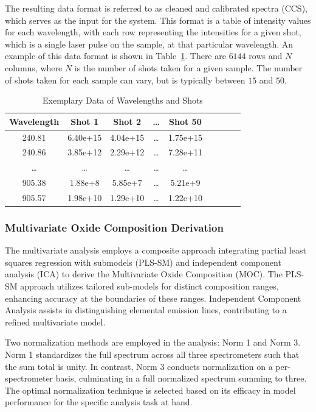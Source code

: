 The resulting data format is referred to as cleaned and calibrated spectra (CCS), which serves as the input for the system.
This format is a table of intensity values for each wavelength, with each row representing the intensities for a given shot, which is a single laser pulse on the sample, at that particular wavelength. An example of this data format is shown in Table~\ref{tab:example_data}. There are $6144$ rows and $N$ columns, where $N$ is the number of shots taken for a given sample. The number of shots taken for each sample can vary, but is typically between $15$ and $50$.

\begin{table}[ht]
\centering
\caption{Exemplary Data of Wavelengths and Shots}
\label{tab:example_data}
\begin{tabular}{|c|c|c|c|c|c|c|c|c|}
\hline
Wavelength & Shot 1   & Shot 2 & \ldots & Shot 50  \\ \hline
240.81     & 6.40e+15 & 4.04e+15 & \ldots& 1.75e+15 \\ \hline
240.86     & 3.85e+12 & 2.29e+12& \ldots & 7.28e+11 \\ \hline
\ldots     & \ldots & \ldots & \ldots & \ldots \\ \hline
905.38     & 1.88e+8 & 5.85e+7 & \ldots & 5.21e+9 \\ \hline
905.57     & 1.98e+10 & 1.29e+10& \ldots & 1.22e+10 \\ \hline
\end{tabular}
\end{table}



\subsubsection{Multivariate Oxide Composition Derivation}\label{sec:moc_derivation}

The multivariate analysis employs a composite approach integrating partial least squares regression with submodels (PLS-SM) and independent component analysis (ICA) to derive the Multivariate Oxide Composition (MOC).
The PLS-SM approach utilizes tailored sub-models for distinct composition ranges, enhancing accuracy at the boundaries of these ranges.
Independent Component Analysis assists in distinguishing elemental emission lines, contributing to a refined multivariate model.

Two normalization methods are employed in the analysis: Norm 1 and Norm 3.
Norm 1 standardizes the full spectrum across all three spectrometers such that the sum total is unity.
In contrast, Norm 3 conducts normalization on a per-spectrometer basis, culminating in a full normalized spectrum summing to three.
The optimal normalization technique is selected based on its efficacy in model performance for the specific analysis task at hand.

